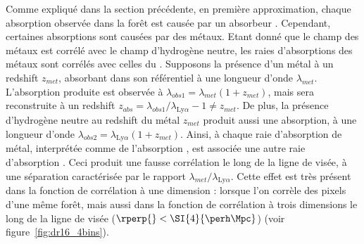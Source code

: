 Comme expliqué dans la section précédente, en première approximation, chaque absorption observée dans la forêt \lya{} est causée par un absorbeur \lya{}. Cependant, certaines absorptions sont causées par des métaux.
Etant donné que le champ des métaux est corrélé avec le champ d'hydrogène neutre, les raies d'absorptions des métaux sont corrélés avec celles du \lya. Supposons la présence d'un métal à un redshift $z_{met}$, absorbant dans son référentiel à une longueur d'onde $\lambda_{met}$. L'absorption produite est observée à $\lambda_{obs1} = \lambda_{met} ( 1 + z_{met})$, mais sera reconstruite à un redshift $z_{abs} = \lambda_{obs1} / \lambda_{\mathrm{Ly}\alpha} - 1 \neq z_{met}$. De plus, la présence d'hydrogène neutre au redshift du métal $z_{met}$ produit aussi une absorption, à une longueur d'onde $\lambda_{obs2} = \lambda_{\mathrm{Ly}\alpha}(1+z_{met})$. Ainsi, à chaque raie d'absorption de métal, interprétée comme de l'absorption \lya{}, est associée une autre raie d'absorption \lya{}. Ceci produit une fausse corrélation le long de la ligne de visée, à une séparation caractérisée par le rapport $\lambda_{met} / \lambda_{\mathrm{Ly}\alpha}$. Cette effet est très présent dans la fonction de corrélation à une dimension : lorsque l'on corrèle des pixels d'une même forêt, mais aussi dans la fonction de corrélation à trois dimensions le long de la ligne de visée ($\rperp{} < \SI{4}{\perh\Mpc}$) (voir figure~\ref{fig:dr16_4bins}).


